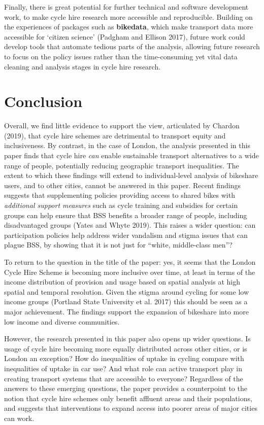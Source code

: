 \documentclass[]{article}
\begin{document}
Finally, there is great potential for further technical and software development work, to make cycle hire research more accessible and reproducible.
Building on the experiences of packages such as \textbf{bikedata}, which make transport data more accessible for `citizen science' (Padgham and Ellison 2017), future work could develop tools that automate tedious parts of the analysis, allowing future research to focus on the policy issues rather than the time-consuming yet vital data cleaning and analysis stages in cycle hire research.

\hypertarget{conclusion}{%
\section{Conclusion}\label{conclusion}}

Overall, we find little evidence to support the view, articulated by Chardon (2019), that cycle hire schemes are detrimental to transport equity and inclusiveness.
By contrast, in the case of London, the analysis presented in this paper finds that cycle hire \emph{can} enable sustainable transport alternatives to a wide range of people, potentially reducing geographic transport inequalities.
The extent to which these findings will extend to individual-level analysis of bikeshare users, and to other cities, cannot be answered in this paper.
Recent findings suggests that supplementing policies providing access to shared bikes with \emph{additional support measures} such as cycle training and subsidies for certain groups can help ensure that BSS benefits a broader range of people, including disadvantaged groups (Yates and Whyte 2019).
This raises a wider question: can participation policies help address wider vandalism and stigma issues that can plague BSS, by showing that it is not just for ``white, middle-class men''?

To return to the question in the title of the paper: yes, it seems that the London Cycle Hire Scheme is becoming more inclusive over time, at least in terms of the income distribution of provision and usage based on spatial analysis at high spatial and temporal resolution.
Given the stigma around cycling for some low income groups (Portland State University et al. 2017) this should be seen as a major achievement.
The findings support the expansion of bikeshare into more low income and diverse communities.

However, the research presented in this paper also opens up wider questions.
Is usage of cycle hire becoming more equally distributed across other cities, or is London an exception?
How do inequalities of uptake in cycling compare with inequalities of uptake in car use?
And what role can active transport play in creating transport systems that are accessible to everyone?
Regardless of the answers to these emerging questions, the paper provides a counterpoint to the notion that cycle hire schemes only benefit affluent areas and their populations, and suggests that interventions to expand access into poorer areas of major cities can work.
\end{document}
